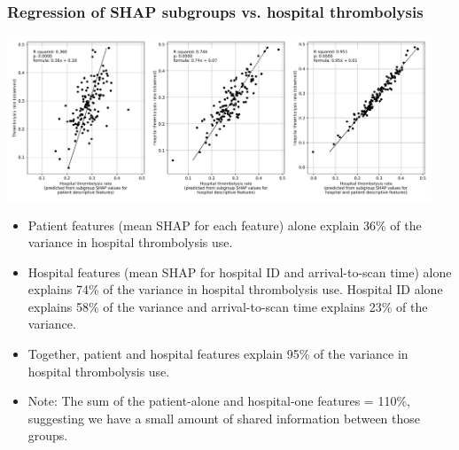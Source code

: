\begin{frame}
\frametitle{Regression of SHAP subgroups vs. hospital thrombolysis}

\begin{center}
\includegraphics[width=0.95\textwidth]{./images/03e_xgb_10_features_multiple_regression_patient_hosptia_mean.jpg}
\end{center}

\scriptsize
\begin{itemize}
    \item Patient features (mean SHAP for each feature) alone explain 36\% of the variance in hospital thrombolysis use.
    \item Hospital features (mean SHAP for hospital ID and arrival-to-scan time) alone explains 74\% of the variance in hospital thrombolysis use. Hospital ID alone explains 58\% of the variance and arrival-to-scan time explains 23\% of the variance.
    \item Together, patient and hospital features explain 95\% of the variance in hospital thrombolysis use.
    \item Note: The sum of the patient-alone and hospital-one features = 110\%, suggesting we have a small amount of shared information between those groups.
\end{itemize}
 
\end{frame}